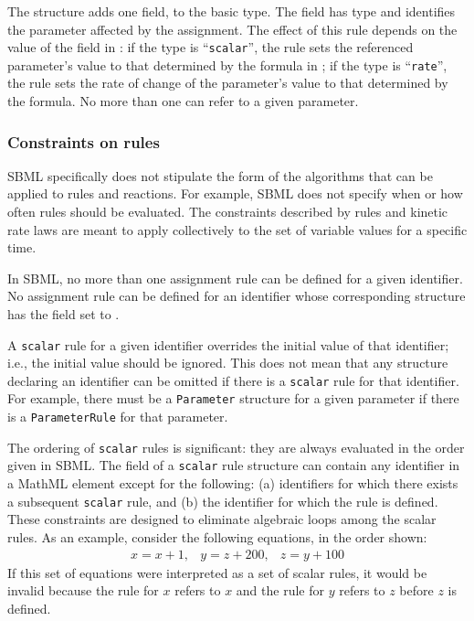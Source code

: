 \documentclass[10pt,twocolumntoc]{cekarticle}
\begin{document}
\subsubsection{}

The  structure adds one field,  to
the basic  type.  The  field has
type  and identifies the parameter affected by the assignment.
The effect of this rule depends on the value of the  field in
: if the type is ``\texttt{scalar}'', the rule sets
the referenced parameter's value to that determined by the formula in
; if the type is ``\texttt{rate}'', the rule sets the rate of
change of the parameter's value to that determined by the formula.  No more
than one  can refer to a given parameter.


\subsubsection{Constraints on rules}
\label{sec:ruleconstraints}

SBML specifically does not stipulate the form of the algorithms that can be
applied to rules and reactions.  For example, SBML does not specify when or
how often rules should be evaluated.  The constraints described by rules
and kinetic rate laws are meant to apply collectively to the set of
variable values for a specific time.

In SBML, no more than one assignment rule can be defined for a given
identifier.  No assignment rule can be defined for an identifier whose
corresponding structure has the field  set to
.

A \texttt{scalar} rule for a given identifier overrides the initial value
of that identifier; i.e., the initial value should be ignored.  This does
not mean that any structure declaring an identifier can be omitted if there
is a \texttt{scalar} rule for that identifier.  For example, there must be
a \texttt{Parameter} structure for a given parameter if there is a
\texttt{ParameterRule} for that parameter.

The ordering of \texttt{scalar} rules is significant: they are always
evaluated in the order given in SBML.  The  field of a
\texttt{scalar} rule structure can contain any identifier in a MathML
 element except for the following: (a) identifiers for which
there exists a subsequent \texttt{scalar} rule, and (b) the identifier for
which the rule is defined.  These constraints are designed to eliminate
algebraic loops among the scalar rules.  As an example, consider the
following equations, in the order shown:
\begin{equation*}
  \begin{array}{lll}
    x = x + 1, & y = z + 200, & z = y + 100
  \end{array}
\end{equation*}
If this set of equations were interpreted as a set of scalar rules, it
would be invalid because the rule for $x$ refers to $x$ and the rule for
$y$ refers to $z$ before $z$ is defined.
\end{document}
